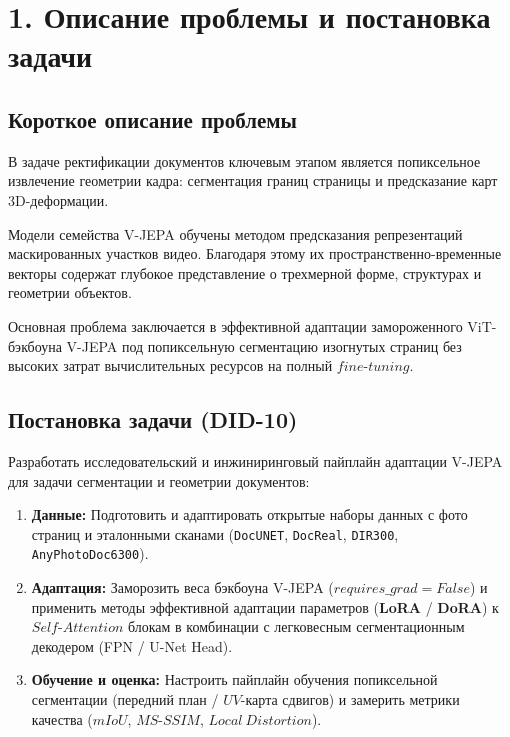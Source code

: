 \documentclass[12pt, a4paper]{article}
\begin{document}
\section*{1. Описание проблемы и постановка задачи}

\subsection*{Короткое описание проблемы}
В задаче ректификации документов ключевым этапом является попиксельное извлечение геометрии кадра: сегментация границ страницы и предсказание карт 3D-деформации. 

Модели семейства V-JEPA обучены методом предсказания репрезентаций маскированных участков видео. Благодаря этому их пространственно-временные векторы содержат глубокое представление о трехмерной форме, структурах и геометрии объектов.

Основная проблема заключается в эффективной адаптации замороженного ViT-бэкбоуна V-JEPA под попиксельную сегментацию изогнутых страниц без высоких затрат вычислительных ресурсов на полный $fine\text{-}tuning$.

\subsection*{Постановка задачи (DID-10)}
Разработать исследовательский и инжиниринговый пайплайн адаптации V-JEPA для задачи сегментации и геометрии документов:
\begin{enumerate}
    \item \textbf{Данные:} Подготовить и адаптировать открытые наборы данных с фото страниц и эталонными сканами (\texttt{DocUNET}, \texttt{DocReal}, \texttt{DIR300}, \texttt{AnyPhotoDoc6300}).
    \item \textbf{Адаптация:} Заморозить веса бэкбоуна V-JEPA ($requires\_grad = False$) и применить методы эффективной адаптации параметров (\textbf{LoRA} / \textbf{DoRA}) к $Self\text{-}Attention$ блокам в комбинации с легковесным сегментационным декодером (FPN / U-Net Head).
    \item \textbf{Обучение и оценка:} Настроить пайплайн обучения попиксельной сегментации (передний план / $UV$-карта сдвигов) и замерить метрики качества ($mIoU$, $MS\text{-}SSIM$, $Local\ Distortion$).
\end{enumerate}
\end{document}
